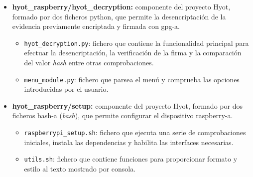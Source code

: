 \documentclass[12pt,a4paper, twoside]{report}
\begin{document}
\begin{itemize}
\begin{itemize}
			\item \texttt{gpg\_module.py}: módulo que hace uso de la funcionalidad provista por \gls{gpg-a} para la encriptación y firmado de evidencias.
			\item \texttt{hyot\_main.py}: fichero que contiene la funcionalidad principal para efectuar la monitorización del entorno. Este fichero importa todos los módulos y realiza llamadas a las funciones de éstos. 
			\item \texttt{hyperledgerFabric\_module.py}: módulo que gestiona la interacción con la \gls{blockchain-a} de \gls{hyperledgerfabric-a}.
			\item \texttt{lcd\_module.py}: módulo que maneja los \glspl{lcd-a}.
			\item \texttt{logger.py}: clase que permite redirigir la salida de la ejecución tanto a un fichero de \textit{log} como a la consola.
			\item \texttt{system\_module.py}: módulo que ejecuta funciones sobre el sistema local, en concreto, la creación, eliminación y establecimiento de permisos de directorios y/o ficheros y la comprobación de existencia de ficheros.
			\item \texttt{token\_module.py}: módulo que contiene funciones para generar \textit{\glspl{token}} empleados en la securización del servidor \gls{rest-a} \gls{api-a} de \gls{hyperledgercomposer-a}.
		\end{itemize}	
		
		\item \textbf{hyot\_raspberry/hyot\_decryption:} componente del proyecto Hyot, formado por dos ficheros \gls{python}, que permite la desencriptación de la evidencia previamente encriptada y firmada con \gls{gpg-a}.
			\begin{itemize}
				\item \texttt{hyot\_decryption.py}: fichero que contiene la funcionalidad principal para efectuar la desencriptación, la verificación de la firma y la comparación del valor \textit{hash} entre otras comprobaciones.
				\item \texttt{menu\_module.py}: fichero que parsea el menú y comprueba las opciones introducidas por el usuario.	
			\end{itemize}
			
		\item \textbf{hyot\_raspberry/setup:} componente del proyecto Hyot, formado por dos ficheros \gls{bash-a} (\textit{\gls{bash}}), que permite configurar el dispositivo \gls{raspberry-a}.
			\begin{itemize}
				\item \texttt{raspberrypi\_setup.sh}: fichero que ejecuta una serie de comprobaciones iniciales, instala las dependencias y habilita las interfaces necesarias.
				\item \texttt{utils.sh}: fichero que contiene funciones para proporcionar formato y estilo al texto mostrado por consola.
			\end{itemize}
					
	\end{itemize}
	
\end{document}
